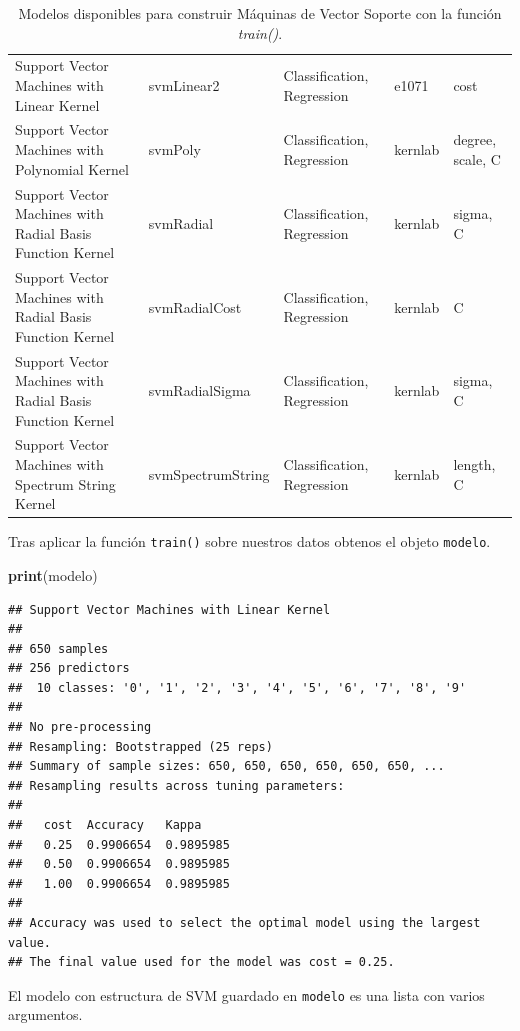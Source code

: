 \documentclass[12pt,spanish,a4paper]{article}
\newenvironment{Shaded}{\begin{snugshade}}{\end{snugshade}}
\newcommand{\KeywordTok}[1]{\textcolor[rgb]{0.13,0.29,0.53}{\textbf{#1}}}
\newcommand{\NormalTok}[1]{#1}
\newcommand{\OperatorTok}[1]{\textcolor[rgb]{0.81,0.36,0.00}{\textbf{#1}}}
\numberwithin{equation}{section}
\begin{document}
\begin{table}[ht]
{\begin{tabular}{p{5cm}p{5cm}p{3cm}p{2cm}p{3cm}}
  Support Vector Machines with Linear Kernel & svmLinear2 & Classification, Regression & e1071 & cost \\ 
  Support Vector Machines with Polynomial Kernel & svmPoly & Classification, Regression & kernlab & degree, scale, C \\ 
  Support Vector Machines with Radial Basis Function Kernel & svmRadial & Classification, Regression & kernlab & sigma, C \\ 
  Support Vector Machines with Radial Basis Function Kernel & svmRadialCost & Classification, Regression & kernlab & C \\ 
  Support Vector Machines with Radial Basis Function Kernel & svmRadialSigma & Classification, Regression & kernlab & sigma, C \\ 
  Support Vector Machines with Spectrum String Kernel & svmSpectrumString & Classification, Regression & kernlab & length, C \\ 
   \hline
\hline
\end{tabular}
}
\caption{Modelos disponibles para construir Máquinas de Vector Soporte con la función {\it train()}.} 
\label{tab:train_models}
\end{table}

Tras aplicar la función \texttt{train()} sobre nuestros datos obtenos el
objeto \texttt{modelo}.

\begin{Shaded}
\begin{Highlighting}[]
\KeywordTok{print}\NormalTok{(modelo)}
\end{Highlighting}
\end{Shaded}

\begin{verbatim}
## Support Vector Machines with Linear Kernel 
## 
## 650 samples
## 256 predictors
##  10 classes: '0', '1', '2', '3', '4', '5', '6', '7', '8', '9' 
## 
## No pre-processing
## Resampling: Bootstrapped (25 reps) 
## Summary of sample sizes: 650, 650, 650, 650, 650, 650, ... 
## Resampling results across tuning parameters:
## 
##   cost  Accuracy   Kappa    
##   0.25  0.9906654  0.9895985
##   0.50  0.9906654  0.9895985
##   1.00  0.9906654  0.9895985
## 
## Accuracy was used to select the optimal model using the largest value.
## The final value used for the model was cost = 0.25.
\end{verbatim}

El modelo con estructura de SVM guardado en \texttt{modelo} es una lista
con varios argumentos.

\begin{Shaded}
\end{Shaded}
\end{document}
